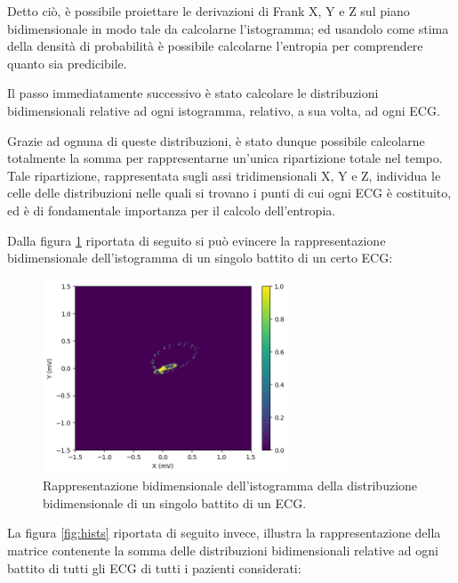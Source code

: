 \documentclass[12pt,italian]{report}
\begin{document}
Detto ciò, è possibile proiettare le derivazioni di Frank X, Y e Z sul piano bidimensionale in modo tale da calcolarne l'istogramma; ed usandolo come stima della densità di probabilità è possibile calcolarne l'entropia per comprendere quanto sia predicibile.

Il passo immediatamente successivo è stato calcolare le distribuzioni bidimensionali relative ad ogni istogramma, relativo, a sua volta, ad ogni ECG.

Grazie ad ognuna di queste distribuzioni, è stato dunque possibile calcolarne totalmente la somma per rappresentarne un'unica ripartizione totale nel tempo. Tale ripartizione, rappresentata sugli assi tridimensionali X, Y e Z, individua le celle delle distribuzioni nelle quali si trovano i punti di cui ogni ECG è costituito, ed è di fondamentale importanza per il calcolo dell'entropia.

Dalla figura \ref{fig:hist} riportata di seguito si può evincere la rappresentazione bidimensionale dell'istogramma di un singolo battito di un certo ECG:

\begin{figure}[H]
    \centering
    \includegraphics[width=0.65\textwidth]{immagini/hist.png}
    \captionsetup{justification=centering}
    \caption{Rappresentazione bidimensionale dell'istogramma della distribuzione bidimensionale di un singolo battito di un ECG.}
    \label{fig:hist}
\end{figure}

La figura \ref{fig:hists} riportata di seguito invece, illustra la rappresentazione della matrice contenente la somma delle distribuzioni bidimensionali relative ad ogni battito di tutti gli ECG di tutti i pazienti considerati:
\end{document}
